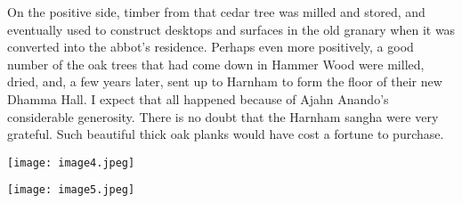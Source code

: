 On the positive side, timber from that cedar tree was milled and stored,
and eventually used to construct desktops and surfaces in the old
granary when it was converted into the abbot's residence. Perhaps even
more positively, a good number of the oak trees that had come down in
Hammer Wood were milled, dried, and, a few years later, sent up to
Harnham to form the floor of their new Dhamma Hall. I expect that all
happened because of Ajahn Anando's considerable generosity. There is no
doubt that the Harnham sangha were very grateful. Such beautiful thick
oak planks would have cost a fortune to purchase.

\texttt{[image: image4.jpeg]}

\texttt{[image: image5.jpeg]}

